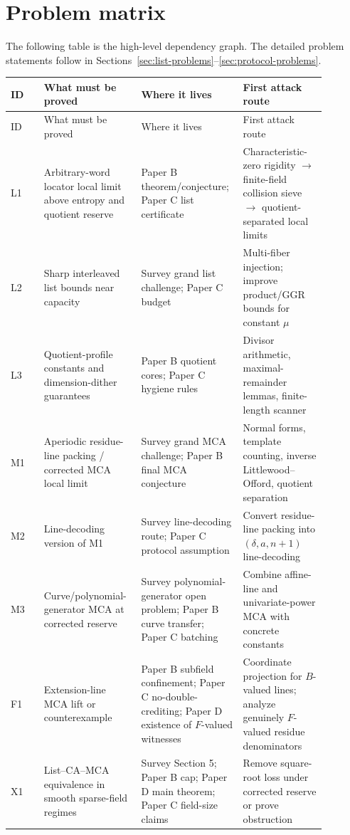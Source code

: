 \documentclass[11pt]{article}
\theoremstyle{definition}
\theoremstyle{remark}
\newcommand{\paperB}{Paper B}
\newcommand{\paperC}{Paper C}
\newcommand{\paperD}{Paper D}
\begin{document}
\section{Problem matrix}

The following table is the high-level dependency graph.  The detailed problem statements follow in Sections~\ref{sec:list-problems}--\ref{sec:protocol-problems}.

\renewcommand{\arraystretch}{1.18}
\begin{longtable}{@{}p{0.10\linewidth}p{0.29\linewidth}p{0.24\linewidth}p{0.25\linewidth}@{}}
\toprule
ID & What must be proved & Where it lives & First attack route \\
\midrule
\endfirsthead
\toprule
ID & What must be proved & Where it lives & First attack route \\
\midrule
\endhead
L1 & Arbitrary-word locator local limit above entropy and quotient reserve & \paperB{} theorem/conjecture; \paperC{} list certificate & Characteristic-zero rigidity $\to$ finite-field collision sieve $\to$ quotient-separated local limits \\
L2 & Sharp interleaved list bounds near capacity & Survey grand list challenge; \paperC{} budget & Multi-fiber injection; improve product/GGR bounds for constant $\mu$ \\
L3 & Quotient-profile constants and dimension-dither guarantees & \paperB{} quotient cores; \paperC{} hygiene rules & Divisor arithmetic, maximal-remainder lemmas, finite-length scanner \\
M1 & Aperiodic residue-line packing / corrected MCA local limit & Survey grand MCA challenge; \paperB{} final MCA conjecture & Normal forms, template counting, inverse Littlewood--Offord, quotient separation \\
M2 & Line-decoding version of M1 & Survey line-decoding route; \paperC{} protocol assumption & Convert residue-line packing into $(\delta,a,n+1)$ line-decoding \\
M3 & Curve/polynomial-generator MCA at corrected reserve & Survey polynomial-generator open problem; \paperB{} curve transfer; \paperC{} batching & Combine affine-line and univariate-power MCA with concrete constants \\
F1 & Extension-line MCA lift or counterexample & \paperB{} subfield confinement; \paperC{} no-double-crediting; \paperD{} existence of $F$-valued witnesses & Coordinate projection for $B$-valued lines; analyze genuinely $F$-valued residue denominators \\
X1 & List--CA--MCA equivalence in smooth sparse-field regimes & Survey Section 5; \paperB{} cap; \paperD{} main theorem; \paperC{} field-size claims & Remove square-root loss under corrected reserve or prove obstruction \\

\end{longtable}
\end{document}
